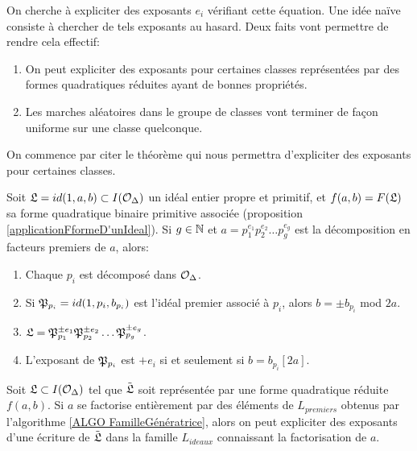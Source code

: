On cherche à expliciter des exposants $e_{i}$ vérifiant cette équation. Une idée naïve consiste à chercher de tels exposants au hasard. Deux faits vont permettre de rendre cela effectif:

\begin{enumerate}
	\item On peut expliciter des exposants pour certaines classes représentées par des formes quadratiques réduites ayant de bonnes propriétés.
	\item Les marches aléatoires dans le groupe de classes vont terminer de façon uniforme sur une classe quelconque.
\end{enumerate}

On commence par citer le théorème qui nous permettra d'expliciter des exposants pour certaines classes.

\begin{The}\label{factorisationClasseIdéaux}
	
	Soit $\mathfrak{L} = id(1,a,b)\subset I(\mathcal{O}_{\Delta})$ un idéal entier propre et primitif, et $f(a,b) = F(\mathfrak{L})$ sa forme quadratique binaire primitive associée (proposition \ref{applicationFformeD'unIdeal}). Si $g\in\mathbb{N}$ et $a = p_{1}^{e_{1}}p_{2}^{e_{2}}\ldots p_{g}^{e_{g}}$ est la décomposition en facteurs premiers de $a$, alors:
	\begin{enumerate}
		\item Chaque $p_{i}$ est décomposé dans $\mathcal{O}_{\Delta}$.
		\item Si $\mathfrak{P}_{p_{i}} = id(1,p_{i},b_{p_{i}})$ est l'idéal premier associé à $p_{i}$, alors $b = \pm b_{p_{i}} $ mod $2a$.
		\item $\mathfrak{L} = \mathfrak{P}_{p_{1}}^{\pm e_{1}}\mathfrak{P}_{p_{2}}^{\pm e_{2}}\ldots\mathfrak{P}_{p_{g}}^{\pm e_{g}}$.
		\item L'exposant de $\mathfrak{P}_{p_{i}}$ est $+e_{i}$ si et seulement si $b = b_{p_i} [2a]$.
	\end{enumerate}
\end{The}

\begin{Coro}\label{classesFactorisables}
	Soit $\mathfrak{L}\subset I(\mathcal{O}_{\Delta})$ tel que $\tilde{\mathfrak{L}}$ soit représentée par une forme quadratique réduite $f(a,b)$. Si $a$ se factorise entièrement par des éléments de $L_{premiers}$ obtenus par l'algorithme \ref{ALGO FamilleGénératrice}, alors on peut expliciter des exposants d'une écriture de $\tilde{\mathfrak{L}}$ dans la famille $L_{ideaux}$ connaissant la factorisation de $a$. 
\end{Coro}

